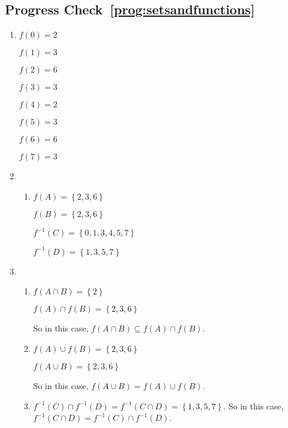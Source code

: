 \subsection*{Progress Check~\ref{prog:setsandfunctions}}
\begin{enumerate}
\item \begin{multicols}{4}
$f ( 0 ) = 2$

$f ( 1 ) = 3$

$f ( 2 ) = 6$

$f ( 3 ) = 3$

$f ( 4 ) = 2$

$f ( 5 ) = 3$

$f ( 6 ) = 6$

$f ( 7 ) = 3$
\end{multicols}

\item \begin{enumerate}
\item \begin{multicols}{2}
$f ( A ) = \left\{ 2, 3, 6 \right\}$

$f ( B ) = \left\{ 2, 3, 6 \right\}$

$f^{-1} ( C ) = \left\{ 0, 1, 3, 4, 5, 7 \right\}$

$f^{-1} ( D ) = \left\{ 1, 3, 5, 7 \right\}$
\end{multicols}
\end{enumerate}

\item \begin{enumerate}
\item \begin{multicols}{2}
$f ( A  \cap  B ) = \left\{ 2 \right\}$

$f ( A ) \cap f ( B ) = \left\{ 2, 3, 6 \right\}$
\end{multicols}
So in this case, 
$f ( A \cap B ) \subseteq f ( A ) \cap f ( B )$.

\item \begin{multicols}{2}

$f ( A )  \cup f ( B ) = \left\{ 2, 3, 6 \right\}$

$f ( A \cup B ) = \left\{ 2, 3, 6 \right\}$
\end{multicols}
So in this case, $f ( A \cup B ) = f ( A ) \cup f ( B )$.

\item 
$f^{-1} ( C ) \cap f^{-1} ( D ) = 
f^{-1} ( C \cap D ) = \left\{ 1, 3, 5, 7 \right\}$.
So in this case, 
$f^{-1} ( C \cap D ) = f^{-1} ( C ) \cap f^{-1} ( D )$.


\end{enumerate}
\end{enumerate}
